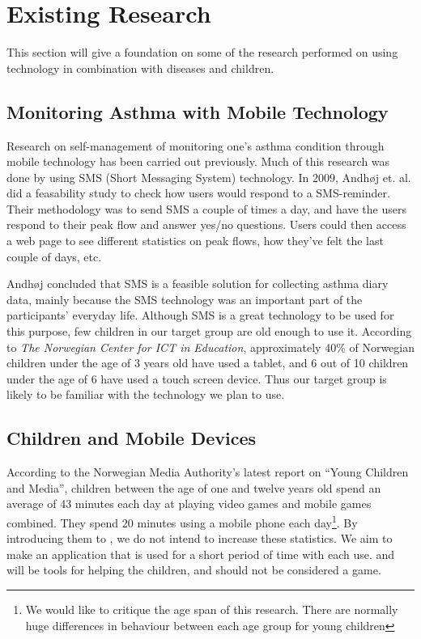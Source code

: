 \section{Existing Research}
\label{sec:existing-research}

This section will give a foundation on some of the research performed on using technology in combination with diseases and children. 


\subsection{Monitoring Asthma with Mobile Technology}
\label{sec:monitoringasthma}
Research on self-management of monitoring one's asthma condition through mobile technology has been carried out previously. Much of this research was done by using SMS (Short Messaging System) technology. In 2009, Andh\o j  et. al.\cite{anhoj2004feasibility} did a feasability study to check how users would respond to a SMS-reminder. Their methodology was to send SMS a couple of times a day, and have the users respond to their peak flow and answer yes/no questions. Users could then access a web page to see different statistics on peak flows, how they've felt the last couple of days, etc.

Andh\o j \etal{} concluded that SMS is a feasible solution for collecting asthma diary data, mainly because the SMS technology was an important part of the participants' everyday life. Although SMS is a great technology to be used for this purpose, few children in our target group are old enough to use it. According to \emph{The Norwegian Center for ICT in Education}, approximately 40\% of Norwegian children under the age of 3 years old have used a tablet, and 6 out of 10 children under the age of 6 have used a touch screen device\cite{nrkchilduse}. Thus our target group is likely to be familiar with the technology we plan to use.  


\subsection{Children and Mobile Devices}
\label{sec:childrenandmobiledevices}

According to the Norwegian Media Authority's latest report on ``Young Children and Media'', children between the age of one and twelve years old spend an average of 43 minutes each day at playing video games and mobile games combined\cite{medietilsynetbarn2014}. They spend 20 minutes using a mobile phone each day\footnote{We would like to critique the age span of this research. There are normally huge differences in behaviour between each age group for young children}. By introducing them to \app{}, we do not intend to increase these statistics. We aim to make an application that is used for a short period of time with each use. \app{} and \ab{} will be tools for helping the children, and should not be considered a game.   

